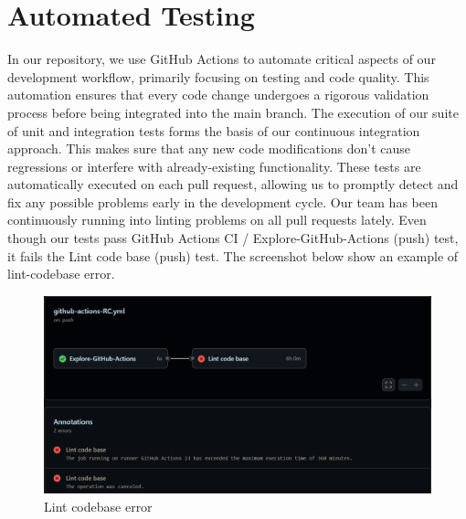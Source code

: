 \documentclass[12pt, titlepage]{article}
\begin{document}
\section{Automated Testing}

In our repository, we use GitHub Actions to automate critical aspects of our development workflow, primarily focusing on testing and code quality. This automation ensures that every code change undergoes a rigorous validation process before being integrated into the main branch. The execution of our suite of unit and integration tests forms the basis of our continuous integration approach. This makes sure that any new code modifications don't cause regressions or interfere with already-existing functionality. These tests are automatically executed on each pull request, allowing us to promptly detect and fix any possible problems early in the development cycle. Our team has been continuously running into linting problems on all pull requests lately. Even though our tests pass GitHub Actions CI / Explore-GitHub-Actions (push) test, it fails the Lint code base (push) test. The screenshot below show an example of lint-codebase error.

\begin{figure}[h]
  \centering
  \includegraphics[width=1\textwidth]{lint_codebase_error.png}
  \caption{Lint codebase error}
\end{figure}

\newpage
\end{document}
